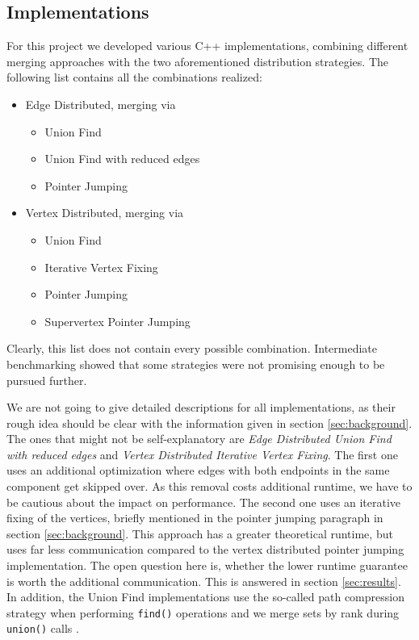 \documentclass[letterpaper]{article}
\begin{document}
\subsection{Implementations}
\label{sec:implementations}
For this project we developed various C++ implementations, combining different merging approaches with the two
aforementioned distribution strategies. The following list contains all the combinations realized:
\begin{itemize}[noitemsep]
  \item Edge Distributed, merging via
  { 
  \begin{itemize}[noitemsep]
     \item Union Find 
     \item Union Find with reduced edges
     \item Pointer Jumping
  \end{itemize} }
  \item Vertex Distributed, merging via
  { 
  \begin{itemize}[noitemsep]
     \item Union Find 
     \item Iterative Vertex Fixing
     \item Pointer Jumping
     \item Supervertex Pointer Jumping
  \end{itemize}
  }
\end{itemize}
Clearly, this list does not contain every possible combination. Intermediate benchmarking showed that some strategies
were not promising enough to be pursued further.

We are not going to give detailed descriptions for all implementations, as their rough idea should be clear with the
information given in section \ref{sec:background}. The ones that might not be self-explanatory are \emph{Edge
Distributed Union Find with reduced edges} and \emph{Vertex Distributed Iterative Vertex Fixing}. The first one uses
an additional optimization where edges with both endpoints in the same component get skipped over. As this removal costs
additional runtime, we have to be cautious about the impact on performance. The second one uses an iterative fixing of
the vertices, briefly mentioned in the pointer jumping paragraph in section \ref{sec:background}. This approach has a
greater theoretical runtime, but uses far less communication compared to the vertex distributed pointer jumping
implementation. The open question here is, whether the lower runtime guarantee is worth the additional communication.
This is answered in section \ref{sec:results}. In addition, the Union Find implementations use the so-called path
compression strategy when performing \verb|find()| operations and we merge sets by rank during \verb|union()| calls
\cite{intro_to_algos}.
\end{document}
